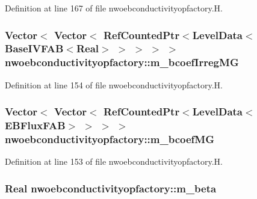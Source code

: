 Definition at line 167 of file nwoebconductivityopfactory.\+H.

\subsubsection[{\texorpdfstring{m\+\_\+bcoef\+Irreg\+MG}{m_bcoefIrregMG}}]{\setlength{\rightskip}{0pt plus 5cm}Vector$<$ Vector$<$ Ref\+Counted\+Ptr$<$Level\+Data$<$Base\+I\+V\+F\+AB$<$Real$>$ $>$ $>$ $>$ $>$ nwoebconductivityopfactory\+::m\+\_\+bcoef\+Irreg\+MG\hspace{0.3cm}{\ttfamily [protected]}}\hypertarget{classnwoebconductivityopfactory_a833457bad5411bfb49a3623aad19fd05}{}\label{classnwoebconductivityopfactory_a833457bad5411bfb49a3623aad19fd05}


Definition at line 154 of file nwoebconductivityopfactory.\+H.

\subsubsection[{\texorpdfstring{m\+\_\+bcoef\+MG}{m_bcoefMG}}]{\setlength{\rightskip}{0pt plus 5cm}Vector$<$ Vector$<$ Ref\+Counted\+Ptr$<$Level\+Data$<$E\+B\+Flux\+F\+AB$>$ $>$ $>$ $>$ nwoebconductivityopfactory\+::m\+\_\+bcoef\+MG\hspace{0.3cm}{\ttfamily [protected]}}\hypertarget{classnwoebconductivityopfactory_a17629dd7d8510eb48dd9f4f23d1f8a2e}{}\label{classnwoebconductivityopfactory_a17629dd7d8510eb48dd9f4f23d1f8a2e}


Definition at line 153 of file nwoebconductivityopfactory.\+H.

\subsubsection[{\texorpdfstring{m\+\_\+beta}{m_beta}}]{\setlength{\rightskip}{0pt plus 5cm}Real nwoebconductivityopfactory\+::m\+\_\+beta\hspace{0.3cm}{\ttfamily [protected]}}\hypertarget{classnwoebconductivityopfactory_a759ca030cc2fc98b57ccda0f891226cd}{}\label{classnwoebconductivityopfactory_a759ca030cc2fc98b57ccda0f891226cd}


